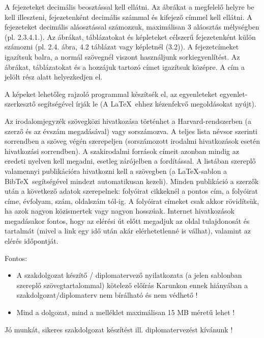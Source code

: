 A fejezeteket decimális beosztással kell ellátni. Az ábrákat a megfelelő helyre be kell illeszteni, fejezetenként decimális számmal és kifejező címmel kell ellátni. A fejezeteket decimális aláosztással számozzuk, maximálisan 3 aláosztás mélységben (pl. 2.3.4.1.). Az ábrákat, táblázatokat és képleteket célszerű fejezetenként külön számozni (pl. 2.4. ábra, 4.2 táblázat vagy képletnél (3.2)). A fejezetcímeket igazítsuk balra, a normál szövegnél viszont használjunk sorkiegyenlítést. Az ábrákat, táblázatokat és a hozzájuk tartozó címet igazítsuk középre. A cím a jelölt rész alatt helyezkedjen el.

A képeket lehetőleg rajzoló programmal készítsék el, az egyenleteket egyenlet-szerkesztő segítségével írják le (A \LaTeX~ehhez kézenfekvő megoldásokat nyújt).

Az irodalomjegyzék szövegközi hivatkozása történhet a Harvard-rendszerben (a szerző és az évszám megadásával) vagy sorszámozva. A teljes lista névsor szerinti sorrendben a szöveg végén szerepeljen (sorszámozott irodalmi hivatkozások esetén hivatkozási sorrendben). A szakirodalmi források címeit azonban mindig az eredeti nyelven kell megadni, esetleg zárójelben a fordítással. A listában szereplő valamennyi publikációra hivatkozni kell a szövegben (a \LaTeX-sablon a Bib\TeX~segítségével mindezt automatikusan kezeli). Minden publikáció a szerzők után a következő adatok szerepelnek: folyóirat cikkeknél a pontos cím, a folyóirat címe, évfolyam, szám, oldalszám tól-ig. A folyóirat címeket csak akkor rövidítsük, ha azok nagyon közismertek vagy nagyon hosszúak. Internet hivatkozások megadásakor fontos, hogy az elérési út előtt megadjuk az oldal tulajdonosát és tartalmát (mivel a link egy idő után akár elérhetetlenné is válhat), valamint az elérés időpontját.

\vspace{5mm}
Fontos:
\begin{itemize}
	\item A szakdolgozat készítő / diplomatervező nyilatkozata (a jelen sablonban szereplő szövegtartalommal) kötelező előírás Karunkon ennek hiányában a szakdolgozat/diplomaterv nem bírálható és nem védhető !
	\item Mind a dolgozat, mind a melléklet maximálisan 15 MB méretű lehet !
\end{itemize}

\vspace{5mm}
\begin{center}
Jó munkát, sikeres szakdolgozat készítést ill. diplomatervezést kívánunk !
\end{center}

\normalsize
